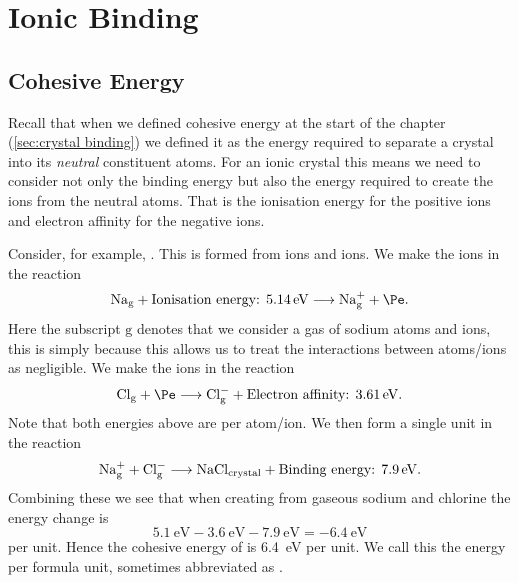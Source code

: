 \documentclass[fleqn]{NotesClass}
\begin{document}
    \section{Ionic Binding}
    \subsection{Cohesive Energy}
    Recall that when we defined cohesive energy at the start of the chapter (\cref{sec:crystal binding}) we defined it as the energy required to separate a crystal into its \emph{neutral} constituent atoms.
    For an ionic crystal this means we need to consider not only the binding energy but also the energy required to create the ions from the neutral atoms.
    That is the ionisation energy for the positive ions and electron affinity for the negative ions.
    
    Consider, for example, .
    This is formed from  ions and  ions.
    We make the  ions in the reaction
    \begin{equation}
        \ce{Na_{\mathrm{g}}} + \text{Ionisation energy: \qty{5.14}{\electronvolt}} \longrightarrow \ce{Na^+_{\mathrm{g}}} + \Pe.
    \end{equation}
    Here the subscript \(\mathrm{g}\) denotes that we consider a gas of sodium atoms and ions, this is simply because this allows us to treat the interactions between atoms/ions as negligible.
    We make the  ions in the reaction
    \begin{equation}
        \ce{Cl_{\mathrm{g}}} + \Pe \longrightarrow \ce{Cl^-_{\mathrm{g}}} + \text{Electron affinity: \qty{3.61}{\electronvolt}}.
    \end{equation}
    Note that both energies above are per atom/ion.
    We then form a single  unit in the reaction
    \begin{equation}
        \ce{Na^+_{\mathrm{g}}} + \ce{Cl^-_{\mathrm{g}}} \longrightarrow \ce{NaCl_{\mathrm{crystal}}} + \text{Binding energy: \qty{7.9}{\electronvolt}}.
    \end{equation}
    Combining these we see that when creating  from gaseous sodium and chlorine the energy change is
    \begin{equation}
        \qty{5.1}{\electronvolt} - \qty{3.6}{\electronvolt} - \qty{7.9}{\electronvolt} = -\qty{6.4}{\electronvolt}
    \end{equation}
    per  unit.
    Hence the cohesive energy of  is \qty{6.4}{\electronvolt} per  unit.
    We call this the energy per formula unit, sometimes abbreviated as \unit{\eVperFormulaUnit}.
    
\end{document}
